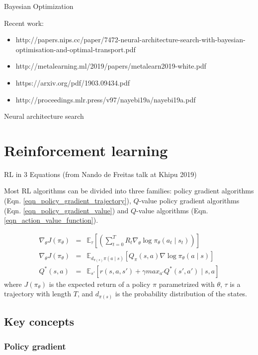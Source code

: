 \documentclass[12pt, english]{article}
\begin{document}
Bayesian Optimization \cite{snoek_practical_2012} \cite{shahriari_taking_2016}

Recent work:

\begin{itemize}
  \item http://papers.nips.cc/paper/7472-neural-architecture-search-with-bayesian-optimisation-and-optimal-transport.pdf
  \item http://metalearning.ml/2019/papers/metalearn2019-white.pdf
  \item https://arxiv.org/pdf/1903.09434.pdf
  \item http://proceedings.mlr.press/v97/nayebi19a/nayebi19a.pdf
\end{itemize}


Neural architecture search


\section{Reinforcement learning}

RL in 3 Equations (from Nando de Freitas talk at Khipu 2019)

Most RL algorithms can be divided into three families: policy gradient algorithms (Eqn. \ref{eqn_policy_gradient_trajectory}), $Q$-value policy gradient algorithms (Eqn. \ref{eqn_policy_gradient_value}) and $Q$-value algorithms (Eqn. \ref{eqn_action_value_function}).

\begin{eqnarray}
  \nabla_\theta J(\pi_\theta) &=& \mathbb{E}_\tau [(\sum_{t=0}^T R_t \nabla_\theta \log \pi_\theta (a_t \mid s_t))] \label{eqn_policy_gradient_trajectory} \\
  \nabla_\theta J(\pi_\theta) &=& \mathbb{E}_{d_{\pi(s)} \pi(a \mid s)} [Q_\pi(s,a) \nabla \log \pi_\theta (a \mid s)] \label{eqn_policy_gradient_value}\\
  Q^*(s,a) &=& \mathbb{E}_{s'} [r(s,a,s') + \gamma max_{a'} Q^*(s',a') \mid s,a] \label{eqn_action_value_function}
\end{eqnarray}
%
where $J(\pi_\theta)$ is the expected return of a policy $\pi$ parametrized with $\theta$, $\tau$ is a trajectory with length $T$, and $d_{\pi(s)}$ is the probability distribution of the states.

\subsection{Key concepts}

\subsubsection{Policy gradient}
\end{document}
